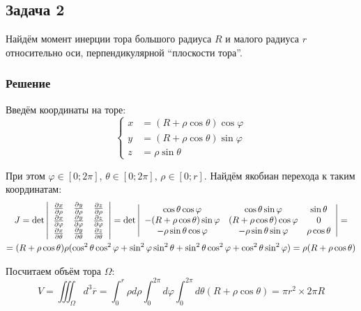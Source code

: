 \documentclass[a4paper,12pt]{article}
\begin{document}
\subsection*{Задача 2}

Найдём момент инерции тора большого радиуса $R$ и малого радиуса
$r$ относительно оси, перпендикулярной ``плоскости тора''.


\subsubsection*{Решение}

Введём координаты на торе:
\[
\begin{cases}
x & =(R+\rho\cos\theta)\cos\varphi\\
y & =(R+\rho\cos\theta)\sin\varphi\\
z & =\rho\sin\theta
\end{cases}
\]

 \noindent
При этом $\varphi\in\left[0;2\pi\right]$, $\theta\in\left[0;2\pi\right]$,
$\rho\in\left[0;r\right]$. Найдём якобиан перехода к таким координатам:
\begin{multline*}
J={\rm det}\left|\begin{array}{ccc}
\frac{\partial x}{\partial\rho} & \frac{\partial y}{\partial\rho} & \frac{\partial z}{\partial\rho}\\
\frac{\partial x}{\partial\varphi} & \frac{\partial y}{\partial\varphi} & \frac{\partial z}{\partial\varphi}\\
\frac{\partial x}{\partial\theta} & \frac{\partial y}{\partial\theta} & \frac{\partial z}{\partial\theta}
\end{array}\right|={\rm det}\left|\begin{array}{ccc}
\cos\theta\cos\varphi & \cos\theta\sin\varphi & \sin\theta\\
-(R+\rho\cos\theta)\sin\varphi & (R+\rho\cos\theta)\cos\varphi & 0\\
-\rho\sin\theta\cos\varphi & -\rho\sin\theta\sin\varphi & \rho\cos\theta
\end{array}\right|=\\
=(R+\rho\cos\theta)\rho(\cos^{2}\theta\cos^{2}\varphi+\sin^{2}\varphi\sin^{2}\theta+\sin^{2}\theta\cos^{2}\varphi+\cos^{2}\theta\sin^{2}\varphi)=\rho(R+\rho\cos\theta)
\end{multline*}

 \noindent
Посчитаем объём тора $\Omega$:
\[
V=\iiint_{\Omega}d^{3}\overline{r}=\int_{0}^{r}\rho d\rho\int_{0}^{2\pi}d\varphi\int_{0}^{2\pi}d\theta\left(R+\rho\cos\theta\right)=\pi r^{2}\times2\pi R
\]
\end{document}
